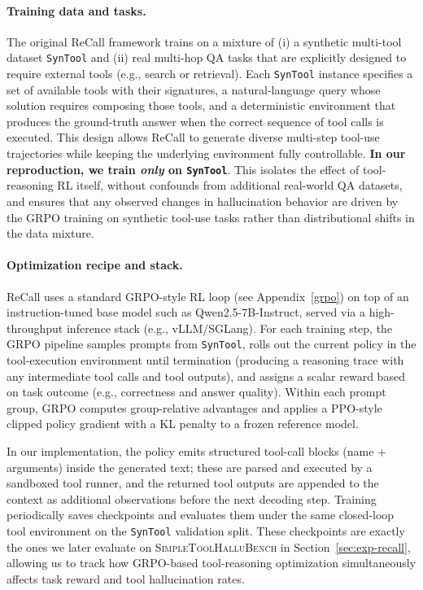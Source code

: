 \documentclass[11pt]{article}
\begin{document}
\paragraph{Training data and tasks.}
The original ReCall framework trains on a mixture of (i) a synthetic multi-tool dataset \texttt{SynTool} and (ii) real multi-hop QA tasks that are explicitly designed to require external tools (e.g., search or retrieval). Each \texttt{SynTool} instance specifies a set of available tools with their signatures, a natural-language query whose solution requires composing those tools, and a deterministic environment that produces the ground-truth answer when the correct sequence of tool calls is executed. This design allows ReCall to generate diverse multi-step tool-use trajectories while keeping the underlying environment fully controllable. 
\textbf{In our reproduction, we train \emph{only} on \texttt{SynTool}}. This isolates the effect of tool-reasoning RL itself, without confounds from additional real-world QA datasets, and ensures that any observed changes in hallucination behavior are driven by the GRPO training on synthetic tool-use tasks rather than distributional shifts in the data mixture.

\paragraph{Optimization recipe and stack.}
ReCall uses a standard GRPO-style RL loop (see Appendix~\ref{grpo}) on top of an instruction-tuned base model such as Qwen2.5-7B-Instruct, served via a high-throughput inference stack (e.g., vLLM/SGLang). For each training step, the GRPO pipeline samples prompts from \texttt{SynTool}, rolls out the current policy in the tool-execution environment until termination (producing a reasoning trace with any intermediate tool calls and tool outputs), and assigns a scalar reward based on task outcome (e.g., correctness and answer quality). Within each prompt group, GRPO computes group-relative advantages and applies a PPO-style clipped policy gradient with a KL penalty to a frozen reference model. 

In our implementation, the policy emits structured tool-call blocks (name + arguments) inside the generated text; these are parsed and executed by a sandboxed tool runner, and the returned tool outputs are appended to the context as additional observations before the next decoding step. Training periodically saves checkpoints and evaluates them under the same closed-loop tool environment on the \texttt{SynTool} validation split. These checkpoints are exactly the ones we later evaluate on \textsc{SimpleToolHalluBench} in Section~\ref{sec:exp-recall}, allowing us to track how GRPO-based tool-reasoning optimization simultaneously affects task reward and tool hallucination rates.
\end{document}
